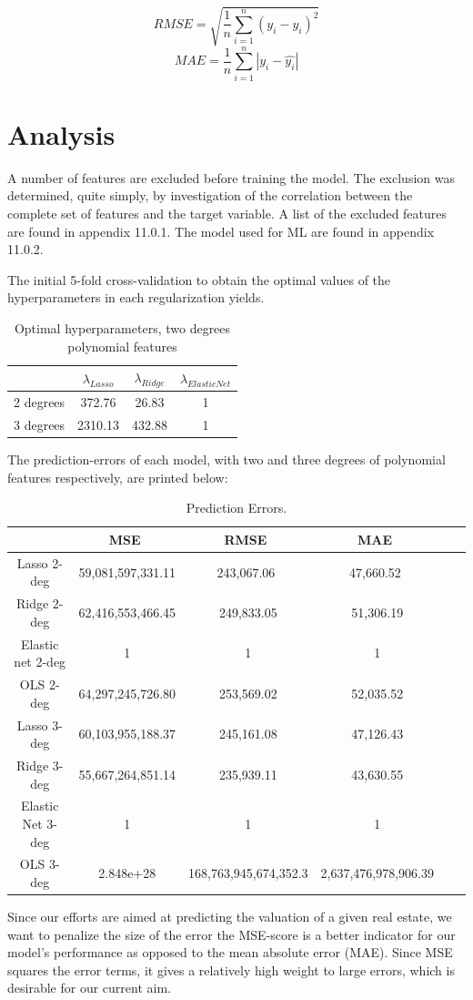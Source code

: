 \documentclass[12pt,a4paper]{article}
\begin{document}
$$ RMSE = \sqrt{\frac{1}{n}\sum_{i=1}^{n}(y_i-\hat{y_i})^2}$$
$$ MAE = \frac{1}{n}\sum_{i=1}^{n}|y_i-\hat{y_i}|$$



\section{Analysis}
A number of features are excluded before training the model. The exclusion was determined, quite simply, by investigation of the correlation between the complete set of features and the target variable. A list of the excluded features are found in appendix 11.0.1. The model used for ML are found in appendix 11.0.2.  

The initial 5-fold cross-validation to obtain the optimal values of the hyperparameters in each regularization yields. 
\begin{table}[h!]
\begin{center}
\caption{Optimal hyperparameters, two degrees polynomial features\label{time}}
\begin{tabular}{ c | c  c  c } 
  & $\lambda_{Lasso}$ & $\lambda_{Ridge}$ &  $\lambda_{Elastic Net}$ \\ \hline
2 degrees  & 372.76 & 26.83 & 1 \\ \hline
3 degrees  & 2310.13 & 432.88 & 1
\end{tabular}
\end{center}
\end{table} 

The prediction-errors of each model, with two and three degrees of polynomial features respectively, are printed below:
\begin{table}[H]
\begin{center}
\caption{Prediction Errors. \label{time}}
\begin{tabular}{| c | c | c | c | c | c |} 
\hline
   & \ MSE \ & \, RMSE \ & \ MAE \ \\ \hline
   Lasso 2-deg & 59,081,597,331.11 & \ 243,067.06 \  & \ 47,660.52 \ \\ 
  Ridge 2-deg & 62,416,553,466.45 & 249,833.05 & 51,306.19  \\ 
  Elastic net 2-deg & 1 & 1 & 1  \\ 
  OLS 2-deg & 64,297,245,726.80 & 253,569.02 & 52,035.52  \\ \hline 
  Lasso 3-deg & 60,103,955,188.37 & 245,161.08 & 47,126.43  \\ 
  Ridge 3-deg & 55,667,264,851.14 & 235,939.11 & 43,630.55  \\ 
  Elastic Net 3-deg & 1 & 1 & 1  \\
  OLS 3-deg & 2.848e+28 & 168,763,945,674,352.3 & 2,637,476,978,906.39  \\ \hline
\end{tabular}
\end{center}
\end{table}
Since our efforts are aimed at predicting the valuation of a given real estate, we want to penalize the size of the error the MSE-score is a better indicator for our model's performance as opposed to the mean absolute error (MAE). Since MSE squares the error terms, it gives a relatively high weight to large errors, which is desirable for our current aim. 
\end{document}

